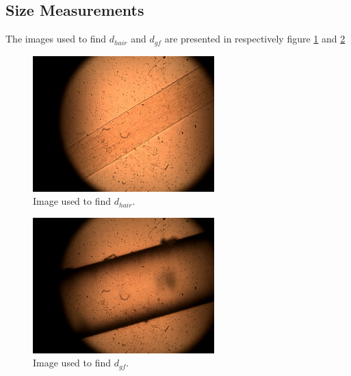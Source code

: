 \subsection{Size Measurements}
\label{appendix_size}

The images used to find $d_{hair}$ and $d_{gf}$ are presented in respectively figure \ref{fig_hair} and \ref{fig_gf}

\begin{figure}[h!]
    \centering
    \includegraphics[width=7cm]{afbeeldingen/size/hair.jpg}
    \captionsetup{font=small, justification = centering}
    \caption{Image used to find $d_{hair}$.}
    \label{fig_hair}
\end{figure}

\begin{figure}[h!]
    \centering
    \includegraphics[width=7cm]{afbeeldingen/size/gf.jpg}
    \captionsetup{font=small, justification = centering}
    \caption{Image used to find $d_{gf}$.}
    \label{fig_gf}
\end{figure}